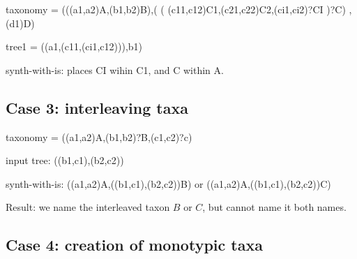 \documentclass[english]{article}
\begin{document}
taxonomy = (((a1,a2)A,(b1,b2)B),( (
(c11,c12)C1,(c21,c22)C2,(ci1,ci2)?CI )?C) ,(d1)D)

tree1 = ((a1,(c11,(ci1,c12))),b1)

synth-with-is: places CI wihin C1, and C within A.

\subsection{Case 3: interleaving taxa}

taxonomy = ((a1,a2)A,(b1,b2)?B,(c1,c2)?c)

input tree: ((b1,c1),(b2,c2))

synth-with-is: ((a1,a2)A,((b1,c1),(b2,c2))B) or
((a1,a2)A,((b1,c1),(b2,c2))C)

Result: we name the interleaved taxon $B$ or $C$, but cannot name it
both names.

\subsection{Case 4: creation of monotypic taxa}
\end{document}
